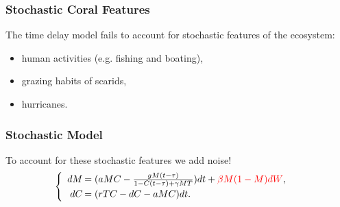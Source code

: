 \begin{frame}\frametitle{Stochastic Coral Features}
The time delay model fails to account for stochastic features of the ecosystem:
\begin{itemize}
\item human activities (e.g. fishing and boating),
\item grazing habits of scarids, 
\item hurricanes.
\end{itemize}
\end{frame}

\begin{frame}
\frametitle{Stochastic Model}
To account for these stochastic features we add noise!
$$\begin{cases}
\begin{array}{rl}
dM\hspace{-.8em}&=(aMC - \frac{gM(t-\tau)}{1-C(t-\tau)+\gamma M T})dt+{\color{red}\beta M(1-M)dW},\\
dC\hspace{-.8em}&=(rTC  - dC - aMC)dt.\\
\end{array}
\end{cases}$$
\end{frame}

